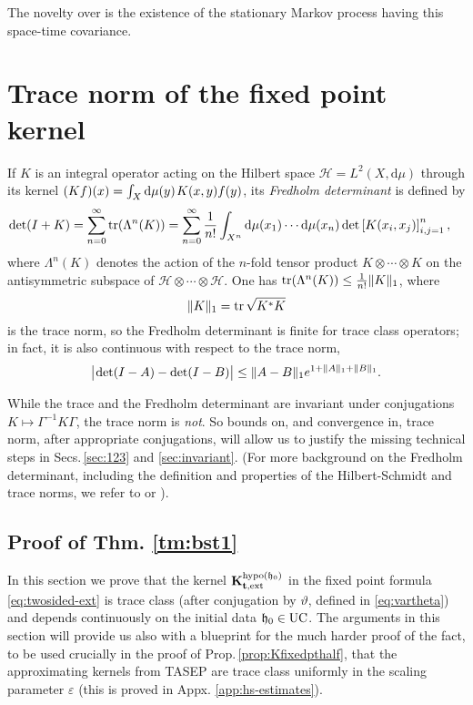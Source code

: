 \documentclass[letterpaper,reqno,11pt,oneside,final]{amsart}
\theoremstyle{definition}
\newcommand{\fh}{\mathfrak{h}}
\newcommand{\ep}{\varepsilon}
\newcommand{\ts}{\hspace{0.1em}}
\newcommand{\tsm}{\hspace{-0.1em}}
\newcommand{\uptext}[1]{\text{\upshape{#1}}}
\DeclareMathOperator{\hypo}{\uptext{hypo}}
\DeclareMathOperator{\UC}{\uptext{UC}}
\DeclareMathOperator{\tr}{\uptext{tr}}
\renewcommand{\d}{\mathrm{d}}
\newcommand{\ft}{\mathbf{t}}
\newcommand{\fK}{\mathbf{K}}
\numberwithin{equation}{section}
\begin{document}
The novelty over \cite{ferrariSpohnStat} is the existence of the stationary Markov process having this space-time covariance.

\appendix


\section{Trace norm of the fixed point kernel}\label{app:hs}

If $K$ is an integral operator acting on the Hilbert space $\mathcal{H}=L^2(X,\d\mu)$ through its kernel $(Kf)(x) = \int_{X}\d\mu(y)\ts K(x,y)f(y)$, its {\it Fredholm determinant} is defined by
\begin{align}\label{FD}
  \det(I+ K) &= \sum_{n=0}^{\infty}\tr(\Lambda^n(K)) = \sum_{n=0}^{\infty} \frac{1}{n!} \int_{X^n}\d\mu(x_1)\cdots\d\mu(x_n) \det\left[K(x_i,x_j)\right]_{i,j=1}^{n} ,
\end{align}
where $\Lambda^n(K)$ denotes the action of the $n$-fold tensor product $K\otimes \cdots\otimes K$ on the antisymmetric subspace of $\mathcal{H}\otimes \cdots\otimes \mathcal{H}$.
One has $\tr(\Lambda^n(K)) \le \frac{1}{n!}\|K\|_1$,
where $$\|K\|_1=\tr\sqrt{K^*K}$$ is the trace norm, so the Fredholm determinant is finite for trace class operators;
in fact, it is also continuous with respect to the trace norm,
\begin{equation}\label{eq:detBd}
  \big|\tsm\det(I-A)-\det(I-B)\big|\leq \|A-B\|_1e^{1+\|A\|_1+\|B\|_1}.
\end{equation}


While the trace and the Fredholm determinant are invariant under conjugations $K\longmapsto \Gamma^{-1}K\Gamma$, the trace norm is \emph{not}.
So bounds on, and convergence in, trace norm, after appropriate conjugations, will allow us to justify the missing technical steps in Secs.\,\ref{sec:123} and \ref{sec:invariant}.  
(For more background on the Fredholm determinant, including the definition and properties of the Hilbert-Schmidt and trace norms, we refer to \cite{simon} or \cite[Sec.~2]{quastelRem-review}).

\subsection{Proof of Thm. \ref{tm:bst1}}

In this section we prove that the kernel $\fK^{\hypo(\fh_0)}_{\ft,\uptext{ext}}$ in the fixed point formula \eqref{eq:twosided-ext} is trace class (after conjugation by $\vartheta$, defined in \eqref{eq:vartheta}) and depends continuously on the initial data $\fh_0\in\UC$.
The arguments in this section will provide us also with a blueprint for the much harder proof of the fact, to be used crucially in the proof of Prop.\,\ref{prop:Kfixedpthalf}, that the approximating kernels from TASEP are trace class uniformly in the scaling parameter $\ep$ (this is proved in Appx. \ref{app:hs-estimates}).
\end{document}
